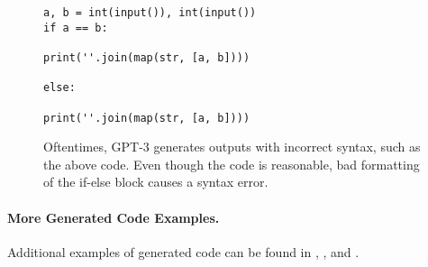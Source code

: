 \documentclass{article}
\begin{document}
\begin{figure*}
 \begin{small}
 \begin{verbatim}
a, b = int(input()), int(input())
if a == b:

print(''.join(map(str, [a, b])))

else:

print(''.join(map(str, [a, b])))
\end{verbatim}
 \end{small}
    \caption{Oftentimes, GPT-3 generates outputs with incorrect syntax, such as the above code. Even though the code is reasonable, bad formatting of the if-else block causes a syntax error.}
    \label{fig:bad_syntax_GPT3}
\end{figure*}




\paragraph{More Generated Code Examples.} Additional examples of generated code can be found in , , and .
\end{document}
